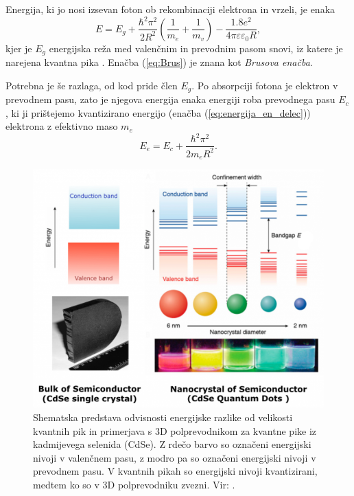 \documentclass[twoside,11pt]{article}
\begin{document}
Energija, ki jo nosi izsevan foton ob rekombinaciji elektrona in vrzeli, je enaka
\begin{equation}
   \label{eq:Brus}
   E = E_g + \frac{\hbar^2 \pi^2}{2R^2}\left(\frac{1}{m_e}+\frac{1}{m_v}\right) - \frac{1.8e^2}{4\pi \varepsilon \varepsilon_0 R},
\end{equation}
kjer je $E_g$ energijska reža med valenčnim in prevodnim pasom snovi, iz katere je narejena kvantna pika \cite{doi:10.1021/ed079p1094}.
Enačba (\ref{eq:Brus}) je znana kot \textit{Brusova enačba}. 

Potrebna je še razlaga, od kod pride člen $E_g$. Po absorpciji fotona je elektron v 
prevodnem pasu, zato je njegova energija enaka energiji roba prevodnega pasu $E_c$, ki ji prištejemo kvantizirano energijo (enačba (\ref{eq:energija_en_delec})) elektrona z efektivno maso $m_e$ \cite{doi:10.1021/j100403a003}
\begin{equation}
   E_e = E_c + \frac{\hbar^2 \pi^2}{2m_eR^2}.
\end{equation}

\begin{figure}[H]
   \begin{center}
       \includegraphics[width=13cm]{figures/band_gap.png}
       \caption{Shematska predstava odvisnosti energijske razlike od velikosti kvantnih pik in primerjava s 3D polprevodnikom za kvantne pike iz kadmijevega selenida (CdSe). Z rdečo barvo so označeni energijski nivoji v valenčnem pasu, z modro pa so označeni energijski nivoji v prevodnem pasu. V kvantnih pikah so energijski nivoji kvantizirani, medtem ko so v 3D polprevodniku zvezni. Vir: \cite{basic}.}
       \label{fig:band_gap_in_QD_and_bulk}
   \end{center}
\end{figure}
\end{document}
